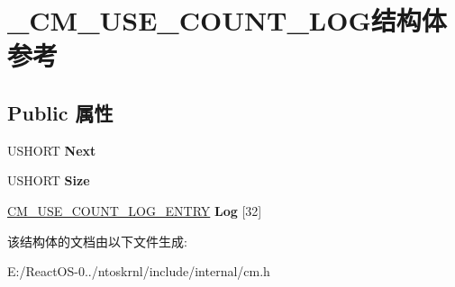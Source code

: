 \hypertarget{struct___c_m___u_s_e___c_o_u_n_t___l_o_g}{}\section{\+\_\+\+C\+M\+\_\+\+U\+S\+E\+\_\+\+C\+O\+U\+N\+T\+\_\+\+L\+O\+G结构体 参考}
\label{struct___c_m___u_s_e___c_o_u_n_t___l_o_g}
\subsection*{Public 属性}
\begin{DoxyCompactItemize}
\item 
\mbox{\label{struct___c_m___u_s_e___c_o_u_n_t___l_o_g_a998c7cb27a153780a6678df0ace33b58}} 
U\+S\+H\+O\+RT {\bfseries Next}
\item 
\mbox{\label{struct___c_m___u_s_e___c_o_u_n_t___l_o_g_a8ed761bee354953ffa6fba45438a8e53}} 
U\+S\+H\+O\+RT {\bfseries Size}
\item 
\mbox{\label{struct___c_m___u_s_e___c_o_u_n_t___l_o_g_a9acd92662b97c512b4381fbf5b10ffcb}} 
\hyperlink{struct___c_m___u_s_e___c_o_u_n_t___l_o_g___e_n_t_r_y}{C\+M\+\_\+\+U\+S\+E\+\_\+\+C\+O\+U\+N\+T\+\_\+\+L\+O\+G\+\_\+\+E\+N\+T\+RY} {\bfseries Log} \mbox{[}32\mbox{]}
\end{DoxyCompactItemize}


该结构体的文档由以下文件生成\+:\begin{DoxyCompactItemize}
\item 
E\+:/\+React\+O\+S-\/0../ntoskrnl/include/internal/cm.\+h\end{DoxyCompactItemize}
